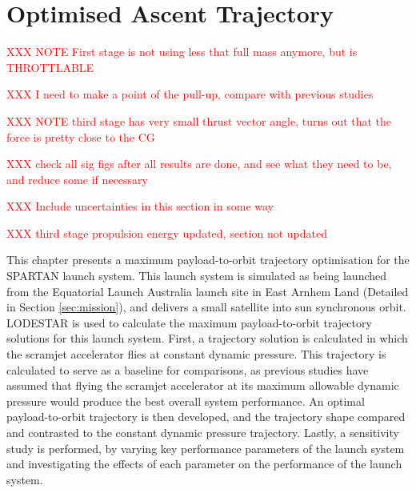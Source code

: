 
\cleardoublepage
\chapter{Optimised Ascent Trajectory}\label{chapter:Ascent}

\textcolor{red}{XXX NOTE First stage is not using less that full mass anymore, but is THROTTLABLE}

\textcolor{red}{XXX I need to make a point of the pull-up, compare with previous studies}
	
	\textcolor{red}{XXX NOTE third stage has very small thrust vector angle, turns out that the force is pretty close to the CG}
	
	\textcolor{red}{XXX check all sig figs after all results are done, and see what they need to be, and reduce some if necessary}

		\textcolor{red}{XXX Include uncertainties in this section in some way}
	
		\textcolor{red}{XXX third stage propulsion energy updated, section not updated}
	
This chapter presents a maximum payload-to-orbit trajectory optimisation for the SPARTAN launch system. 
This launch system is simulated as being launched from the Equatorial Launch Australia launch site in East Arnhem Land (Detailed in Section \ref{sec:mission}), and delivers a small satellite into sun synchronous orbit. LODESTAR is used to calculate the maximum payload-to-orbit trajectory solutions for this launch system.
First, a trajectory solution is calculated in which the scramjet accelerator flies at constant dynamic pressure. This trajectory is calculated to serve as a baseline for comparisons, as previous studies have assumed that flying the scramjet accelerator at its maximum allowable dynamic pressure would produce the best overall system performance\cite{Preller2017b}. An optimal payload-to-orbit trajectory is then developed, and the trajectory shape compared and contrasted to the constant dynamic pressure trajectory.
Lastly, a sensitivity study is performed, by varying key performance parameters of the launch system and investigating the effects of each parameter on the performance of the launch system. 

